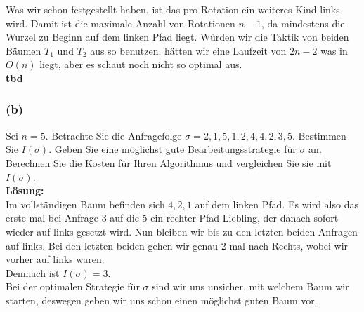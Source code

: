 \documentclass[11pt,a4paper,ngerman]{article}
\begin{document}
Was wir schon festgestellt haben, ist das pro Rotation ein weiteres Kind links wird. Damit ist die maximale Anzahl von Rotationen $n-1$, da mindestens die Wurzel zu Beginn auf dem linken Pfad liegt. Würden wir die Taktik von beiden Bäumen $T_1$ und $T_2$ aus so benutzen, hätten wir eine Laufzeit von $2n-2$ was in $O(n)$ liegt, aber es schaut noch nicht so optimal aus.\\

\textbf{tbd}

\subsubsection*{(b)}

Sei $n=5$. Betrachte Sie die Anfragefolge $\sigma = 2,1,5,1,2,4,4,2,3,5$. Bestimmen Sie $I(\sigma)$. Geben Sie eine möglichst gute Bearbeitungsstrategie für $\sigma$ an. Berechnen Sie die Kosten für Ihren Algorithmus und vergleichen Sie sie mit $I(\sigma)$.\\

\noindent\textbf{Lösung:}\\

Im vollständigen Baum befinden sich $4,2,1$ auf dem linken Pfad. Es wird also das erste mal bei Anfrage $3$ auf die 5 ein rechter Pfad Liebling, der danach sofort wieder auf links gesetzt wird. Nun bleiben wir bis zu den letzten beiden Anfragen auf links. Bei den letzten beiden gehen wir genau 2 mal nach Rechts, wobei wir vorher auf links waren.\\

Demnach ist $I(\sigma) = 3$.\\

Bei der optimalen Strategie für $\sigma$ sind wir uns unsicher, mit welchem Baum wir starten, deswegen geben wir uns schon einen möglichst guten Baum vor.
\end{document}
